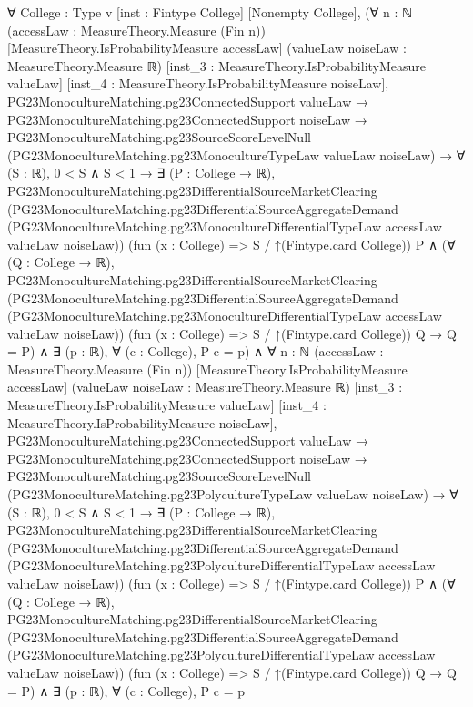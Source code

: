 \documentclass[10pt]{article}
\begin{document}
\begin{ReviewVerbatim}
∀ {College : Type v} [inst : Fintype College] [Nonempty College],
  (∀ {n : ℕ} (accessLaw : MeasureTheory.Measure (Fin n)) [MeasureTheory.IsProbabilityMeasure accessLaw]
      (valueLaw noiseLaw : MeasureTheory.Measure ℝ) [inst_3 : MeasureTheory.IsProbabilityMeasure valueLaw]
      [inst_4 : MeasureTheory.IsProbabilityMeasure noiseLaw],
      PG23MonocultureMatching.pg23ConnectedSupport valueLaw →
        PG23MonocultureMatching.pg23ConnectedSupport noiseLaw →
          PG23MonocultureMatching.pg23SourceScoreLevelNull
              (PG23MonocultureMatching.pg23MonocultureTypeLaw valueLaw noiseLaw) →
            ∀ (S : ℝ),
              0 < S ∧ S < 1 →
                ∃ (P : College → ℝ),
                  PG23MonocultureMatching.pg23DifferentialSourceMarketClearing
                      (PG23MonocultureMatching.pg23DifferentialSourceAggregateDemand
                        (PG23MonocultureMatching.pg23MonocultureDifferentialTypeLaw accessLaw valueLaw noiseLaw))
                      (fun (x : College) => S / ↑(Fintype.card College)) P ∧
                    (∀ (Q : College → ℝ),
                        PG23MonocultureMatching.pg23DifferentialSourceMarketClearing
                            (PG23MonocultureMatching.pg23DifferentialSourceAggregateDemand
                              (PG23MonocultureMatching.pg23MonocultureDifferentialTypeLaw accessLaw valueLaw noiseLaw))
                            (fun (x : College) => S / ↑(Fintype.card College)) Q →
                          Q = P) ∧
                      ∃ (p : ℝ), ∀ (c : College), P c = p) ∧
    ∀ {n : ℕ} (accessLaw : MeasureTheory.Measure (Fin n)) [MeasureTheory.IsProbabilityMeasure accessLaw]
      (valueLaw noiseLaw : MeasureTheory.Measure ℝ) [inst_3 : MeasureTheory.IsProbabilityMeasure valueLaw]
      [inst_4 : MeasureTheory.IsProbabilityMeasure noiseLaw],
      PG23MonocultureMatching.pg23ConnectedSupport valueLaw →
        PG23MonocultureMatching.pg23ConnectedSupport noiseLaw →
          PG23MonocultureMatching.pg23SourceScoreLevelNull
              (PG23MonocultureMatching.pg23PolycultureTypeLaw valueLaw noiseLaw) →
            ∀ (S : ℝ),
              0 < S ∧ S < 1 →
                ∃ (P : College → ℝ),
                  PG23MonocultureMatching.pg23DifferentialSourceMarketClearing
                      (PG23MonocultureMatching.pg23DifferentialSourceAggregateDemand
                        (PG23MonocultureMatching.pg23PolycultureDifferentialTypeLaw accessLaw valueLaw noiseLaw))
                      (fun (x : College) => S / ↑(Fintype.card College)) P ∧
                    (∀ (Q : College → ℝ),
                        PG23MonocultureMatching.pg23DifferentialSourceMarketClearing
                            (PG23MonocultureMatching.pg23DifferentialSourceAggregateDemand
                              (PG23MonocultureMatching.pg23PolycultureDifferentialTypeLaw accessLaw valueLaw noiseLaw))
                            (fun (x : College) => S / ↑(Fintype.card College)) Q →
                          Q = P) ∧
                      ∃ (p : ℝ), ∀ (c : College), P c = p
\end{ReviewVerbatim}
\end{document}
